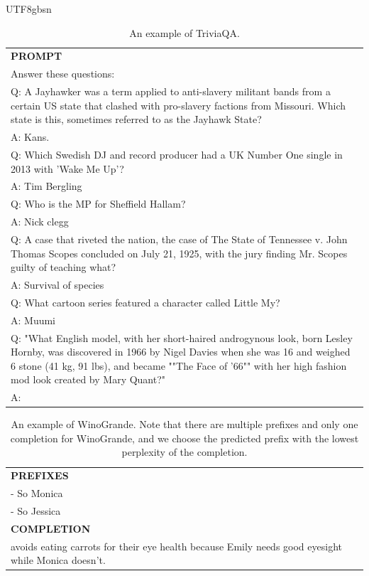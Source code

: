 \documentclass[11pt, a4paper, logo, copyright, nonumbering]{deepseek}
\begin{document}
\begin{CJK*}{UTF8}{gbsn}
\begin{table}[ht]
    \centering \small
\begin{tabular}{p{12cm}}
\toprule
\textbf{PROMPT}\\
Answer these questions:\\
Q: A Jayhawker was a term applied to anti-slavery militant bands from a certain US state that clashed with pro-slavery factions from Missouri. Which state is this, sometimes referred to as the Jayhawk State?\\
A: Kans.\\
Q: Which Swedish DJ and record producer had a UK Number One single in 2013 with 'Wake Me Up'?\\
A: Tim Bergling\\
Q: Who is the MP for Sheffield Hallam?\\
A: Nick clegg\\
Q: A case that riveted the nation, the case of The State of Tennessee v. John Thomas Scopes concluded on July 21, 1925, with the jury finding Mr. Scopes guilty of teaching what?\\
A: Survival of species\\
Q: What cartoon series featured a character called Little My?\\
A: Muumi\\
Q: "What English model, with her short-haired androgynous look, born Lesley Hornby, was discovered in 1966 by Nigel Davies when she was 16 and weighed 6 stone (41 kg, 91 lbs), and became ""The Face of '66"" with her high fashion mod look created by Mary Quant?"\\
A:\\
\bottomrule
\end{tabular}
    \caption{\centering An example of TriviaQA.}
    \label{tab:triviaqa_eval_format_example}
\end{table}

\begin{table}[ht]
    \centering \small
\begin{tabular}{p{12cm}}
\toprule
\textbf{PREFIXES}\\
- So Monica\\
- So Jessica\\
\midrule
\textbf{COMPLETION}\\
avoids eating carrots for their eye health because Emily needs good eyesight while Monica doesn't.\\
\bottomrule
\end{tabular}
    \caption{An example of WinoGrande. Note that there are multiple prefixes and only one completion for WinoGrande, and we choose the predicted prefix with the lowest perplexity of the completion.}
    \label{tab:winogrande_eval_format_example}
\end{table}


\end{CJK*}
\end{document}
